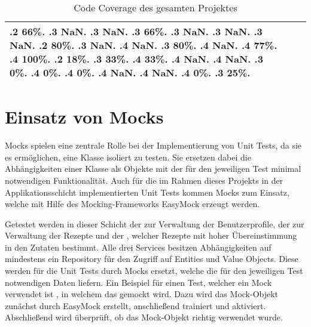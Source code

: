 \begin{table}[ht]
\begin{tabular}{|l|c|c|}
\begin{minipage}{2.5cm}
{            .2 66\%.
            .3 NaN.
            .3 NaN.
            .3 66\%.
            .3 NaN.
            .3 NaN.
            .3 NaN.
            .2 80\%.
            .3 NaN.
            .4 NaN.
            .3 80\%.
            .4 NaN.
            .4 77\%.
            .4 100\%.
            .2 18\%.
            .3 33\%.
            .4 33\%.
            .4 NaN.
            .4 NaN.
            .3 0\%.
            .4 0\%.
            .4 0\%.
            .4 NaN.
            .4 NaN.
            .4 0\%.
            .3 25\%.
        }\end{minipage} \\
        \hline
    \end{tabular}
    \caption{Code Coverage des gesamten Projektes}
    \label{tab:code-coverage-full}
\end{table}

\section{Einsatz von Mocks}
\label{sec:mocks}
Mocks spielen eine zentrale Rolle bei der Implementierung von Unit Tests, da sie es ermöglichen, eine Klasse isoliert zu testen. Sie ersetzen dabei die Abhängigkeiten einer Klasse als Objekte mit der für den jeweiligen Test minimal notwendigen Funktionalität. Auch für die im Rahmen dieses Projekts in der Applikationsschicht implementierten Unit Tests kommen Mocks zum Einsatz, welche mit Hilfe des Mocking-Frameworks EasyMock erzeugt werden.

Getestet werden in dieser Schicht der  zur Verwaltung der Benutzerprofile, der  zur Verwaltung der Rezepte und der , welcher Rezepte mit hoher Übereinstimmung in den Zutaten bestimmt. Alle drei Services besitzen Abhängigkeiten auf mindestens ein Repository für den Zugriff auf Entities und Value Objects. Diese werden für die Unit Tests durch Mocks ersetzt, welche die für den jeweiligen Test notwendigen Daten liefern. Ein Beispiel für einen Test, welcher ein Mock verwendet ist \href{https://github.com/anditru/quickie/blob/bb41442c7f1ffbfcd3117cd86a40f7932e543a33/2-quickie-application/src/test/java/org/pinkcrazyunicorn/quickie/application/profile/ProfileServiceTest.java#L18}{}, in welchem das  gemockt wird. Dazu wird das Mock-Objekt zunächst durch EasyMock erstellt, anschließend trainiert und aktiviert. Abschließend wird überprüft, ob das Mock-Objekt richtig verwendet wurde.
